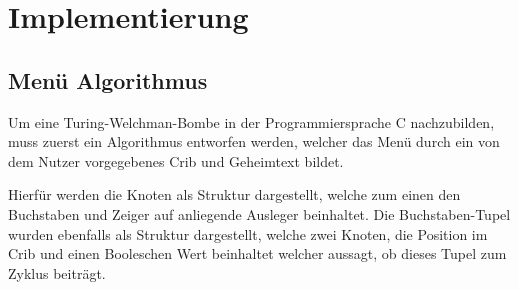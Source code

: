 \chapter{Implementierung}

%
%

\section{Menü Algorithmus}\label{sec:cycle-finding-algorithm}
Um eine Turing-Welchman-Bombe in der Programmiersprache C nachzubilden, muss zuerst ein Algorithmus entworfen werden, welcher das Menü durch ein von dem Nutzer vorgegebenes Crib und 
Geheimtext bildet.

Hierfür werden die Knoten als Struktur dargestellt, welche zum einen den Buchstaben und Zeiger auf anliegende Ausleger beinhaltet. 
Die Buchstaben-Tupel wurden ebenfalls als Struktur dargestellt, welche zwei Knoten, die Position im Crib und einen Booleschen Wert beinhaltet welcher aussagt, ob dieses Tupel zum Zyklus beiträgt.


